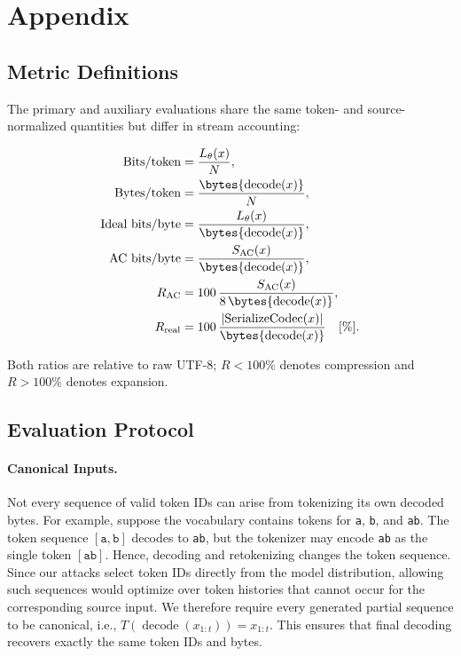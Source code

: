 \section{Appendix}

\subsection{Metric Definitions}
The primary and auxiliary evaluations share the same token- and source-normalized quantities but differ in stream accounting:

\begin{align}
  \text{Bits/token} &= \frac{L_\theta(x)}{N},\\
  \text{Bytes/token} &= \frac{\bytes{\operatorname{decode}(x)}}{N},\\
  \text{Ideal bits/byte} &= \frac{L_\theta(x)}
    {\bytes{\operatorname{decode}(x)}},\\
  \text{AC bits/byte} &= \frac{S_{\mathrm{AC}}(x)}
    {\bytes{\operatorname{decode}(x)}},\\
  R_{\mathrm{AC}} &= 100\,\frac{S_{\mathrm{AC}}(x)}
    {8\,\bytes{\operatorname{decode}(x)}},\\
  R_{\mathrm{real}} &= 100\,\frac{\left|\operatorname{SerializeCodec}(x)\right|}
    {\bytes{\operatorname{decode}(x)}} \quad [\%].
\end{align}

Both ratios are relative to raw UTF-8; $R<100\%$ denotes compression and $R>100\%$ denotes expansion.

\subsection{Evaluation Protocol}
\label{app:experimental-details}

\paragraph{Canonical Inputs.}
\label{app:canonicality}
Not every sequence of valid token IDs can arise from tokenizing its own decoded
bytes. For example, suppose the vocabulary contains tokens for
\texttt{a}, \texttt{b}, and \texttt{ab}. The token sequence
$[\texttt{a},\texttt{b}]$ decodes to \texttt{ab}, but the tokenizer may encode
\texttt{ab} as the single token $[\texttt{ab}]$. Hence, decoding and
retokenizing changes the token sequence. Since our attacks select token IDs
directly from the model distribution, allowing such sequences would optimize
over token histories that cannot occur for the corresponding source input.
We therefore require every generated partial sequence to be canonical, i.e.,
$T(\operatorname{decode}(x_{1:t}))=x_{1:t}$. This ensures that final decoding
recovers exactly the same token IDs and bytes.

